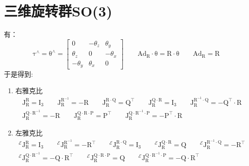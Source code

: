 \documentclass[12pt, onecolumn]{article}
\newcommand\normf{\fangsong}
\newcommand\liehat[1]{#1^{\land}}
\newcommand\bsm[1]{\boldsymbol{\mathrm{#1}}}
\begin{document}
	\section{\normf 三维旋转群SO(3)}
	有：
	\begin{equation}
	\liehat{\bsm{\tau}}=\liehat{\bsm{\theta}}=\begin{bmatrix}
	0&-\theta_z&\theta_y\\
	\theta_z&0&-\theta_x\\
	-\theta_y&\theta_x&0
	\end{bmatrix}
	\qquad
	\bsm{Ad}_{\bsm{R}}\cdot\bsm{\theta}=\bsm{R}\cdot\bsm{\theta}
	\qquad
	\bsm{Ad}_{\bsm{R}}=\bsm{R}
	\end{equation}
		于是得到:
	\begin{enumerate}
	\item 右雅克比
	\begin{equation}
	\begin{gathered}
	\bsm{J}_{\bsm{R}}^{\bsm{R}}=\bsm{I}_3
	\qquad
	\bsm{J}_{\bsm{R}}^{\bsm{R}^{-1}}=-\bsm{R}
	\qquad
	\bsm{J}_{\bsm{R}}^{\bsm{R}\cdot\bsm{Q}}=\bsm{Q}^\top
	\qquad
	\bsm{J}_{\bsm{R}}^{\bsm{Q}\cdot\bsm{R}}=\bsm{I}_3
	\qquad
	\bsm{J}_{\bsm{R}}^{\bsm{R}^{-1}\cdot\bsm{Q}}=-\bsm{Q}^\top\cdot\bsm{R}
	\\
	\bsm{J}_{\bsm{R}}^{\bsm{Q}\cdot\bsm{R}^{-1}}=-\bsm{R}
	\qquad
	\bsm{J}_{\bsm{R}}^{\bsm{Q}\cdot\bsm{R}\cdot\bsm{P}}=\bsm{P}^\top
	\qquad
	\bsm{J}_{\bsm{R}}^{\bsm{Q}\cdot\bsm{R}^{-1}\cdot\bsm{P}}=
	-\bsm{P}^\top\cdot\bsm{R}
	\end{gathered}
	\end{equation}

	\item 左雅克比
	\begin{equation}
	\begin{gathered}
	^\mathcal{E}\bsm{J}_{\bsm{R}}^{\bsm{R}}=\bsm{I}_3
	\qquad
	^\mathcal{E}\bsm{J}_{\bsm{R}}^{\bsm{R}^{-1}}=-\bsm{R}^\top
	\qquad
	^\mathcal{E}\bsm{J}_{\bsm{R}}^{\bsm{R}\cdot\bsm{Q}}=\bsm{I}_3
	\qquad
	^\mathcal{E}\bsm{J}_{\bsm{R}}^{\bsm{Q}\cdot\bsm{R}}=\bsm{Q}
	\qquad
	^\mathcal{E}\bsm{J}_{\bsm{R}}^{\bsm{R}^{-1}\cdot\bsm{Q}}=-\bsm{R}^\top
	\\
	^\mathcal{E}\bsm{J}_{\bsm{R}}^{\bsm{Q}\cdot\bsm{R}^{-1}}=-\bsm{Q}\cdot\bsm{R}^\top
	\qquad
	^\mathcal{E}\bsm{J}_{\bsm{R}}^{\bsm{Q}\cdot\bsm{R}\cdot\bsm{P}}=\bsm{Q}
	\qquad
	^\mathcal{E}\bsm{J}_{\bsm{R}}^{\bsm{Q}\cdot\bsm{R}^{-1}\cdot\bsm{P}}=-\bsm{Q}\cdot\bsm{R}^\top
	\end{gathered}
	\end{equation}
	\end{enumerate}
\end{document}
